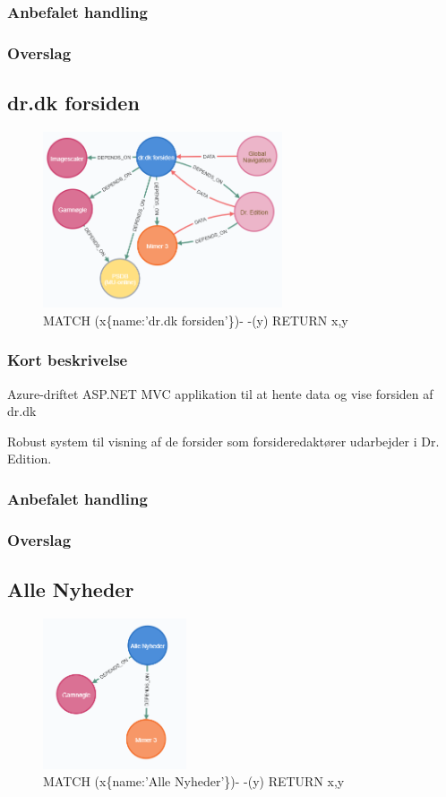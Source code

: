 \documentclass{article}
\begin{document}
\subsubsection{Anbefalet handling}
\subsubsection{Overslag}


\subsection{dr.dk forsiden}
\begin{figure}[h]
\includegraphics[width=200pt]{DrDkForsiden.PNG}
\caption{MATCH (x\{name:'dr.dk forsiden'\})- -(y) RETURN x,y}
\end{figure}
\subsubsection{Kort beskrivelse}
Azure-driftet ASP.NET MVC applikation til at hente data og vise forsiden af dr.dk

Robust system til visning af de forsider som forsideredaktører udarbejder i Dr. Edition.
\subsubsection{Anbefalet handling}
\subsubsection{Overslag}


\subsection{Alle Nyheder}
\begin{figure}[h]
\includegraphics[width=120pt]{AlleNyheder.PNG}
\caption{MATCH (x\{name:'Alle Nyheder'\})- -(y) RETURN x,y}
\end{figure}
\end{document}
